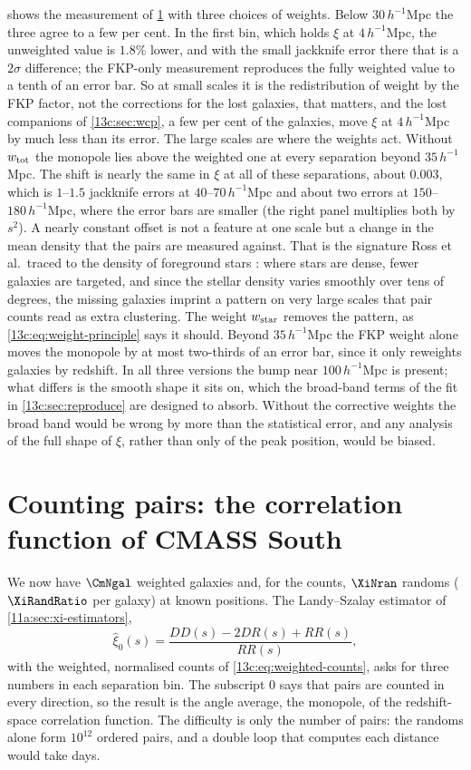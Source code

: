  shows the measurement of \cref{13c:sec:paircounts} with three
choices of weights. Below $30\,h^{-1}$Mpc the three agree to a few per cent. In the first bin, which holds
$\xi$ at $4\,h^{-1}$Mpc, the unweighted value is $1.8\%$ lower, and with the small
jackknife error there that is a $2\sigma$ difference; the FKP-only measurement
reproduces the fully weighted value to a tenth of an error bar. So at small scales it
is the redistribution of weight by the FKP factor, not the corrections for the lost
galaxies, that matters, and the lost companions of \cref{13c:sec:wcp}, a few per cent
of the galaxies, move $\xi$ at $4\,h^{-1}$Mpc by much less than its error. The large scales are where the weights act. Without $w_{\rm tot}$ the
monopole lies above the weighted one at every separation beyond $35\,h^{-1}$Mpc. The
shift is nearly the same in $\xi$ at all of these separations, about $0.003$, which
is $1$--$1.5$ jackknife errors at $40$--$70\,h^{-1}$Mpc and about two errors at
$150$--$180\,h^{-1}$Mpc, where the error bars are smaller (the right panel multiplies
both by $s^2$). A nearly constant offset is not a feature at one scale but a change in the
mean density that the pairs are measured against. That is the signature Ross et al.\ traced to the
density of foreground stars \cite{Ross2012}: where stars are dense, fewer galaxies
are targeted, and since the stellar density varies smoothly over tens of degrees, the
missing galaxies imprint a pattern on very large scales that pair counts read as extra
clustering. The weight $w_{\rm star}$ removes the pattern, as
\eqref{13c:eq:weight-principle} says it should. Beyond $35\,h^{-1}$Mpc the FKP weight alone moves the monopole by at most two-thirds
of an error bar, since it only reweights galaxies by redshift. In all three versions the bump near
$100\,h^{-1}$Mpc is present; what differs is the smooth shape it sits on, which the
broad-band terms of the fit in \cref{13c:sec:reproduce} are designed to absorb. Without
the corrective weights the broad band would be wrong by more than the statistical error,
and any analysis of the full shape of $\xi$, rather than only of the peak position,
would be biased.
\section{Counting pairs: the correlation function of CMASS South}
\label{13c:sec:paircounts}

We now have $\CmNgal$ weighted galaxies and, for the counts, $\XiNran$ randoms
($\XiRandRatio$ per galaxy) at known positions. The Landy--Szalay estimator of
\cref{11a:sec:xi-estimators},
\begin{equation}
  \hat\xi_0(s)=\frac{DD(s)-2DR(s)+RR(s)}{RR(s)},
  \label{13c:eq:ls}
\end{equation}
with the weighted, normalised counts of \eqref{13c:eq:weighted-counts}, asks for
three numbers in each separation bin. The subscript $0$ says that pairs are counted
in every direction, so the result is the angle average, the monopole, of the
redshift-space correlation function. The difficulty is only the number of pairs:
the randoms alone form $10^{12}$ ordered pairs, and a double loop that
computes each distance would take days.

